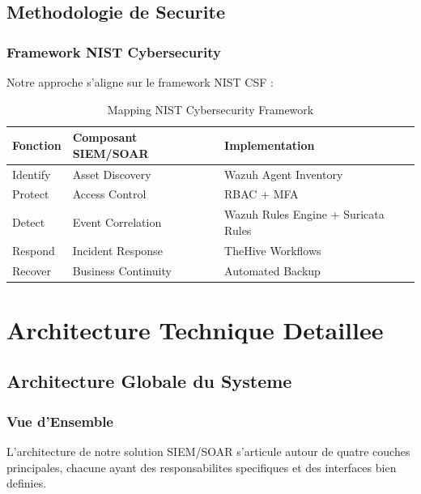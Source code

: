 \subsection{Methodologie de Securite}


\subsubsection{Framework NIST Cybersecurity}

Notre approche s'aligne sur le framework NIST CSF :

\begin{table}[H]
    \centering
    \caption{Mapping NIST Cybersecurity Framework}
    \begin{tabular}{|l|l|l|}
        \hline
        \textbf{Fonction} & \textbf{Composant SIEM/SOAR} & \textbf{Implementation}             \\
        \hline
        Identify          & Asset Discovery              & Wazuh Agent Inventory               \\
        \hline
        Protect           & Access Control               & RBAC + MFA                          \\
        \hline
        Detect            & Event Correlation            & Wazuh Rules Engine + Suricata Rules \\
        \hline
        Respond           & Incident Response            & TheHive Workflows                   \\
        \hline
        Recover           & Business Continuity          & Automated Backup                    \\
        \hline
    \end{tabular}
\end{table}

\section{Architecture Technique Detaillee}

\subsection{Architecture Globale du Systeme}

\subsubsection{Vue d'Ensemble}

L'architecture de notre solution SIEM/SOAR s'articule autour de quatre couches principales, chacune ayant des responsabilites specifiques et des interfaces bien definies.

